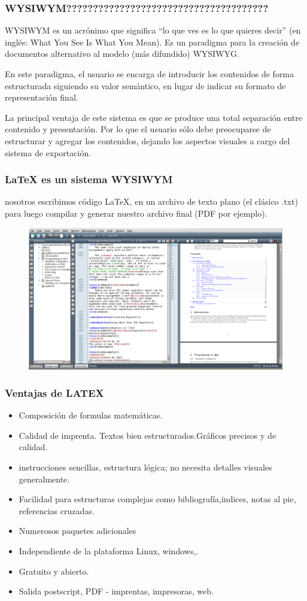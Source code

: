 \documentclass{beamer}
\begin{document}
\begin{frame}
  \frametitle{WYSIWYM??????????????????????????????????????}
WYSIWYM es un acrónimo que significa “lo que ves es lo que quieres decir” (en inglés: What You See Is What You Mean). Es un paradigma para la creación de documentos alternativo al modelo (más difundido) WYSIWYG.

En este paradigma, el usuario se encarga de introducir los contenidos de forma estructurada siguiendo su valor semántico, en lugar de indicar su formato de representación final. 

La principal ventaja de este sistema es que se produce una total separación entre contenido y presentación. Por lo que el usuario sólo debe preocuparse de estructurar y agregar los contenidos, dejando los aspectos visuales a cargo del sistema de exportación. 
\end{frame}
\begin{frame}
\frametitle{\LaTeX{} es un sistema WYSIWYM}
nosotros escribimos código \LaTeX{}, en un archivo de texto plano (el clásico .txt) para luego compilar y generar nuestro archivo final (PDF por ejemplo).
  \begin{figure}
    \includegraphics[width=0.8\linewidth]{img/latex1.png}
  \end{figure}
\end{frame}


\begin{frame}
  \frametitle{Ventajas de LATEX}
  \begin{itemize}
      \item Composición de formulas matemáticas.
      \item Calidad de imprenta. Textos bien estructurados.Gráficos precisos y de calidad.
      \item instrucciones sencillas, estructura lógica; no necesita detalles visuales generalmente.
      \item Facilidad para estructuras complejas como bibliografía,indices, notas al pie, referencias cruzadas.
      \item Numerosos paquetes adicionales
      \item Independiente de la plataforma Linux, windows,.
      \item Gratuito y abierto.
      \item Salida postscript, PDF - imprentas, impresoras, web.
  \end{itemize}
\end{frame}
\end{document}

